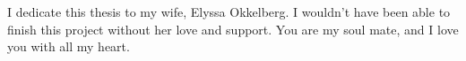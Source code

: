 
I dedicate this thesis to my wife, Elyssa Okkelberg. I wouldn't have been able to finish this project without her love and support. You are my soul mate, and I love you with all my heart.